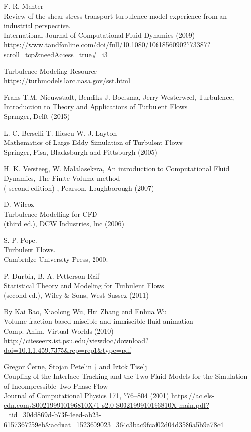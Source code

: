 \documentclass[a4paper, 12pt]{report}
\begin{document}
\begin{thebibliography}{9}
	 F. R. Menter \\ Review of the shear-stress transport turbulence model experience from an industrial perspective,\\
	International Journal of Computational Fluid Dynamics (2009)\\
	\url{https://www.tandfonline.com/doi/full/10.1080/10618560902773387?scroll=top&needAccess=true#_i3}
	
	Turbulence Modeling Resource \\
	\url{https://turbmodels.larc.nasa.gov/sst.html}

	Frans T.M. Nieuwstadt, Bendiks J. Boersma, Jerry Westerweel,
	Turbulence, Introduction to Theory and Applications
of Turbulent Flows \\
	 Springer, Delft (2015)
	 
     L. C. Berselli T. Iliescu W. J. Layton\\	 
	 Mathematics of Large Eddy Simulation of Turbulent Flows \\
	 Springer, Pisa, Blacksburgh and Pittsburgh (2005)	 
	 
	H. K. Versteeg, W. Malalasekera, An introduction to Computational Fluid Dynamics, The Finite Volume method\\
	 ( second edition) , Pearson, Loughborough (2007)
	 
	 D. Wilcox\\
	 Turbulence Modelling for CFD\\
	(third ed.), DCW Industries, Inc (2006)
	
	S. P. Pope.\\
	Turbulent Flows.\\
	Cambridge University Press, 2000.

	 P. Durbin, B. A. Petterson Reif\\
	 Statistical Theory and Modeling for Turbulent Flows\\
	(second ed.), Wiley \& Sons, West Sussex (2011)
	
	By Kai Bao, Xiaolong Wu, Hui Zhang and Enhua Wu\\
	Volume fraction based miscible and immiscible fluid animation\\
	Comp. Anim. Virtual Worlds (2010)
	\url{http://citeseerx.ist.psu.edu/viewdoc/download?doi=10.1.1.459.7375&rep=rep1&type=pdf}
	
	Gregor Černe, Stojan Petelin † and Iztok Tiselj\\
	Coupling of the Interface Tracking and the Two-Fluid Models 		for the Simulation of Incompressible Two-Phase Flow\\
	Journal of Computational Physics 171, 776–804 (2001)
	\url{https://ac.els-cdn.com/S002199910196810X/1-s2.0-S002199910196810X-main.pdf?_tid=30dd869d-b73f-4eed-ab23-6157367259eb&acdnat=1523609023_364c3bac9fcaf02d04d3586a5b9a78c4}
	

\end{thebibliography}
\end{document}
